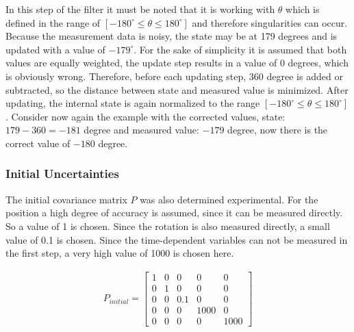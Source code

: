 \documentclass[11pt,oneside,openright]{mpreport}
\begin{document}
In this step of the filter it must be noted that it is working with $\theta$ which is defined in the range of $ [- 180^{\circ} \le \theta \le 180^{\circ}] $ and therefore singularities can occur.
Because the measurement data is noisy, the state may be at 179 degrees and is updated with a value of $ -179^{\circ} $. For the sake of simplicity it is assumed that both values are equally weighted,
the update step results in a value of 0 degrees, which is obviously wrong. Therefore, before each updating step, $ 360 $ degree is added or subtracted,
so the distance between state and measured value is minimized. After updating, the internal state is again normalized to the range $ [- 180^{\circ} \le \theta \le 180^{\circ}] $.
Consider now again the example with the corrected values, state: $ 179-360 = -181 $ degree and measured value: $ -179 $ degree, now there is the correct value of $ -180 $ degree.


\subsubsection{Initial Uncertainties}

The initial covariance matrix $ P $ was also determined experimental. For the position a high degree of accuracy is assumed, since it can be measured directly.
So a value of 1 is chosen. Since the rotation is also measured directly, a small value of 0.1 is chosen. Since the time-dependent variables can not be measured in the first step,
a very high value of 1000 is chosen here.

\begin{align*}
P_{initial}=
\begin{bmatrix}
1 & 0 & 0 & 0 & 0\\
0 & 1 & 0 & 0 & 0\\
0 & 0 & 0.1 & 0 & 0\\
0 & 0 & 0 & 1000 & 0\\
0 & 0 & 0 & 0 & 1000
\end{bmatrix} 
\end{align*}
\end{document}
